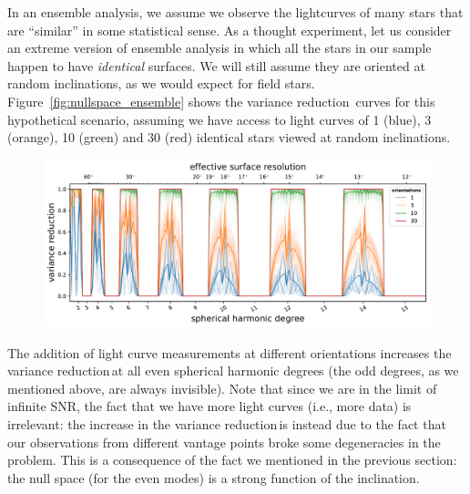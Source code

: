 \documentclass[modern]{aastex62}
\newcommand{\shrinkage}{{variance reduction\,}}
\begin{document}
In an ensemble analysis, we assume we observe the lightcurves of many stars
that are ``similar'' in some statistical sense. As a thought experiment,
let us consider an extreme version of ensemble analysis in which all the
stars in our sample happen to have \emph{identical} surfaces. We will
still assume they are oriented at random inclinations, as we would expect for
field stars.
%
Figure~\ref{fig:nullspace_ensemble} shows the \shrinkage
curves for this hypothetical scenario, assuming we have access to
light curves of 1 (blue), 3 (orange), 10 (green) and 30 (red)
identical stars viewed at random inclinations.

\begin{figure}[t!]
    \begin{centering}
        \includegraphics[width=\linewidth]{figures/nullspace_ensemble.pdf}
    \end{centering}
\end{figure}

The addition of light curve measurements at different orientations
increases the \shrinkage at all even spherical harmonic degrees
(the odd degrees, as we mentioned above, are always invisible).
Note that since we are in the limit of infinite SNR, the fact that we have
more light curves (i.e., more data) is irrelevant: the
increase in the \shrinkage is instead due to the fact that our observations
from different vantage points broke some degeneracies in the problem.
This is a consequence of the fact we mentioned in the previous section:
the null space (for the even modes)
is a strong function of the inclination.
\end{document}
